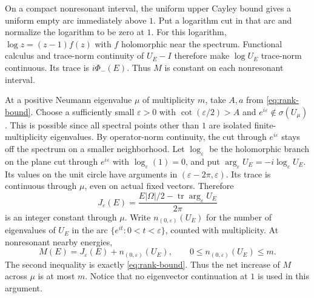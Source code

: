 \documentclass[11pt]{amsart}
\numberwithin{equation}{section}
\newcommand{\tr}{\operatorname{tr}}
\begin{document}
On a compact nonresonant interval, the uniform upper Cayley bound gives
a uniform empty arc immediately above $1$. Put a logarithm cut in that
arc and normalize the logarithm to be zero at $1$. For this logarithm, $\log z=(z-1)f(z)$ with $f$ holomorphic near
the spectrum. Functional calculus and trace-norm continuity of
$U_E-I$ therefore make $\log U_E$ trace-norm continuous. Its trace
is $i\Phi_-(E)$. Thus $M$ is constant on each nonresonant
interval.

At a positive Neumann eigenvalue $\mu$ of multiplicity $m$, take $A,a$
from \eqref{eq:rank-bound}. Choose a sufficiently small $\varepsilon>0$
with $\cot(\varepsilon/2)>A$ and $e^{i\varepsilon}\notin\sigma(U_\mu)$.
This is possible since all spectral points other than $1$ are isolated
finite-multiplicity eigenvalues. By operator-norm continuity, the cut
through $e^{i\varepsilon}$ stays off the spectrum on a smaller neighborhood.
Let $\log_\varepsilon$ be the holomorphic branch on the plane cut
through $e^{i\varepsilon}$ with $\log_\varepsilon(1)=0$, and put
$\arg_\varepsilon U_E=-i\log_\varepsilon U_E$. Its values on the unit
circle have arguments in $(\varepsilon-2\pi,\varepsilon)$. Its trace is
continuous through $\mu$, even on actual fixed vectors. Therefore
\[
 J_\varepsilon(E)=\frac{E|\Omega|/2-
                 \tr\arg_\varepsilon U_E}{2\pi}
\]
is an integer constant through $\mu$. Write
$n_{(0,\varepsilon)}(U_E)$ for the number of eigenvalues of $U_E$
in the arc $\{e^{it}:0<t<\varepsilon\}$, counted with multiplicity.
At nonresonant nearby energies,
\begin{equation}\label{eq:jump-count}
 M(E)=J_\varepsilon(E)+n_{(0,\varepsilon)}(U_E),\qquad
 0\le n_{(0,\varepsilon)}(U_E)\le m.
\end{equation}
The second inequality is exactly \eqref{eq:rank-bound}. Thus the net
increase of $M$ across $\mu$ is at most $m$. Notice that no eigenvector
continuation at $1$ is used in this argument.
\end{document}
